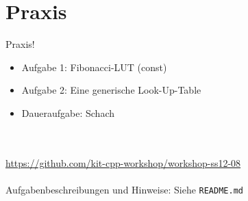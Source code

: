 \section{Praxis}
\begin{frame}[fragile]{Praxis!}
	\begin{itemize}
		\item Aufgabe 1: Fibonacci-LUT (const)
		\item Aufgabe 2: Eine generische Look-Up-Table
		\item Daueraufgabe: Schach
	\end{itemize}
	\ \\
	\ \\
	\large{\url{https://github.com/kit-cpp-workshop/workshop-ss12-08}} \\
	\ \\
	Aufgabenbeschreibungen und Hinweise: Siehe \verb|README.md|

\end{frame}
